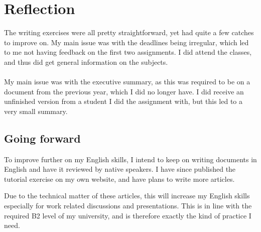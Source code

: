 \documentclass[11pt,english]{article}
\begin{document}
	\newpage
	\section{Reflection}
	The writing exercises were all pretty straightforward, yet had quite a few
	catches to improve on. My main issue was with the deadlines being
	irregular, which led to me not having feedback on the first two
	assignments. I did attend the classes, and thus did get general information
	on the subjects.

	\paragraph{}
	My main issue was with the executive summary, as this was required to be on
	a document from the previous year, which I did no longer have. I did
	receive an unfinished version from a student I did the assignment with, but
	this led to a very small summary.

	\subsection{Going forward}
	To improve further on my English skills, I intend to keep on writing
	documents in English and have it reviewed by native speakers. I have since
	published the tutorial exercise on my own website, and have plans to write
	more articles.

	Due to the technical matter of these articles, this will increase my
	English skills especially for work related discussions and presentations.
	This is in line with the required B2 level of my university, and is
	therefore exactly the kind of practice I need.
\end{document}
